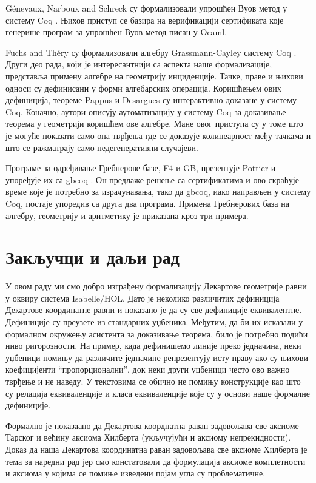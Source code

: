 G\'enevaux, Narboux and Schreck су формализовали упрошћен Вуов метод у
систему Coq \cite{wucoq}. Њихов приступ се базира на верификацији
сертификата које генерише програм за упрошћен Вуов метод писан у
Ocaml.

Fuchs and Th{\'e}ry су формализовали алгебру Grassmann-Cayley систему
Coq \cite{grassman}. Други део рада, који је интересантнији са аспекта
наше формализације, представља примену алгебре на геометрију
инциденције. Тачке, праве и њихови односи су дефинисани у форми
алгебарских операција. Коришћењем ових дефиниција, теореме Pappus и
Desargues су интерактивно доказане у систему Coq. Коначно, аутори
описују аутоматизацију у систему Coq за доказивање теорема у
геометрији коришћем ове алгебре. Мане овог приступа су у томе што је
могуће показати само она тврђења где се доказује колинеарност међу
тачкама и што се ражматрају само недегенеративни случајеви.

Програме за одређивање Гребнерове базе, F4 и GB, презентује Pottier и
упоређује их са gbcoq \cite{grobner_coq}. Он предлаже решење са
сертификатима и ово скраћује време које је потребно за израчунавања,
тако да gbcoq, иако направљен у систему Coq, постаје упоредив са друга
два програма. Примена Гребнерових база на алгебру, геометрију и
аритметику је приказана кроз три примера.


\section{Закључци и даљи рад}
\label{sec:concl}

У овом раду ми смо добро изграђену формализацију Декартове геометрије
равни у оквиру система Isabelle/HOL. Дато је неколико различитих
дефиниција Декартове координатне равни и показано је да су све
дефиниције еквивалентне. Дефиниције су преузете из стандарних
уџбеника.  Међутим, да би их исказали у формалном окружењу асистента
за доказивање теорема, било је потребно подићи ниво ригорозности. На
пример, када дефинишемо линије преко једначина, неки уџбеници помињу
да различите једначине репрезентују исту праву ако су њихови
коефицијенти ``пропорционални'', док неки други уџбеници често ово
важно тврђење и не наведу. У текстовима се обично не помињу
конструкције као што су релација еквиваленције и класа еквиваленције
које су у основи наше формалне дефиниције.

Формално је показаано да Декартова коорднатна раван задовољава све
аксиоме Тарског и већину аксиома Хилберта (укључујући и аксиому
непрекидности).  Доказ да наша Декартова координатна раван задовољава
све аксиоме Хилберта је тема за наредни рад јер смо констатовали да
формулација аксиоме комплетности и аксиома у којима се помиње изведени
појам угла су проблематичне.

